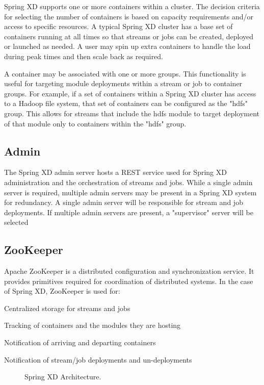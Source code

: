 Spring XD supports one or more containers within a cluster. The decision criteria
for selecting the number of containers is based on capacity requirements and/or access
to specific resources.  A typical Spring XD cluster has a base set of containers
running at all times so that streams or jobs can be created, deployed or launched
as needed. A user may spin up extra containers to handle the load during peak times
and then scale back as required.

A container may be associated with one or more groups. This functionality is useful
for targeting module deployments within a stream or job to container groups.
For example, if a set of containers within a Spring XD cluster has access to
a Hadoop file system, that set of containers can be configured as the "hdfs" group.
This allows for streams that include the hdfs module to target deployment of
that module only to containers within the "hdfs" group.

\subsection{Admin}
The Spring XD admin server hosts a REST service used for Spring XD
administration and the orchestration of streams and jobs. While a single
admin server is required, multiple admin servers may be present in a Spring XD
system for redundancy. A single admin server will be responsible for stream
and job deployments. If multiple admin servers are present, a "supervisor"
server will be selected 

\subsection{ZooKeeper}
Apache ZooKeeper is a distributed configuration and synchronization service.
It provides primitives required for coordination of distributed systems.
In the case of Spring XD, ZooKeeper is used for: \begin{itemize*}
	\item Centralized storage for streams and jobs
	\item Tracking of containers and the modules they are hosting
	\item Notification of arriving and departing containers
	\item Notification of stream/job deployments and un-deployments
\end{itemize*}
\begin{figure}[ht]
\centering
{}
\caption{Spring XD Architecture.}
\label{fig:architecture}
\end{figure}

